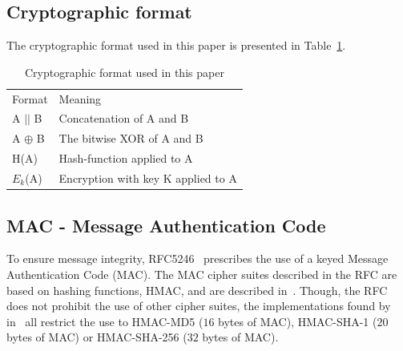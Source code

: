 \documentclass[10pt,conference,a4paper]{IEEEtran}
\begin{document}
\subsection{Cryptographic format}
\label{sec:crypto:format}
The cryptographic format used in this paper is presented in Table~\ref{sec:crypto:format:table}.
\begin{table}[h]
    \begin{tabular}{ll}
    Format & Meaning \\
    A $||$ B    & Concatenation of A and B  \\
    A $\oplus$ B  & The bitwise XOR of A and B     \\
    H(A)    & Hash-function applied to A    \\
    $E_k$(A)    & Encryption with key K applied to A    \\
    \end{tabular}
    \caption{Cryptographic format used in this paper}
    \label{sec:crypto:format:table}
\end{table}

\subsection{MAC - Message Authentication Code}
\label{sec:crypto:hmac}
To ensure message integrity, RFC5246~\cite{ietf2008transport} prescribes the use of a keyed Message Authentication Code (MAC). The MAC cipher suites described in the RFC are based on hashing functions, HMAC, and are described in~\cite{krawczyk1997rfc}. Though, the RFC does not prohibit the use of other cipher suites, the implementations found by~\citeauthor{alfardan2013lucky} in~\cite{alfardan2013lucky} all restrict the use to HMAC-MD5 ($16$ bytes of MAC), HMAC-SHA-1 ($20$ bytes of MAC) or HMAC-SHA-256 ($32$ bytes of MAC).
\end{document}
